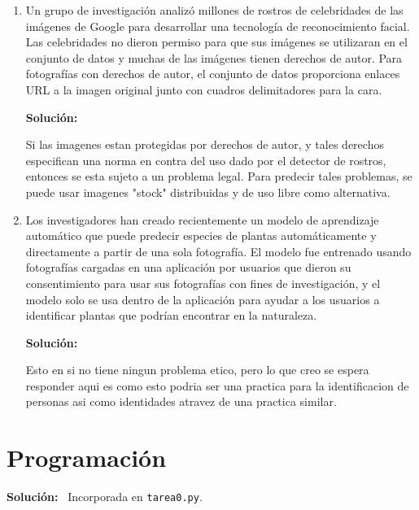 \documentclass[11pt,letterpaper]{article}
\newenvironment{solution}{%
  \noindent\begin{shaded}
  \textbf{Solución:}\ }{
  \end{shaded}%
}
\begin{document}
\begin{enumerate}
\item%
  Un grupo de investigación analizó millones de rostros de
  celebridades de las imágenes de Google para desarrollar una
  tecnología de reconocimiento facial.  Las celebridades no dieron
  permiso para que sus imágenes se utilizaran en el conjunto de datos
  y muchas de las imágenes tienen derechos de autor.  Para fotografías
  con derechos de autor, el conjunto de datos proporciona enlaces URL
  a la imagen original junto con cuadros delimitadores para la cara.
  \begin{solution}
  \end{solution}

  Si las imagenes estan protegidas por derechos de autor, y tales derechos especifican una norma en contra del uso dado por el detector de rostros, entonces se esta sujeto a un problema legal. Para predecir tales problemas, se puede usar imagenes "stock" distribuidas y de uso libre como alternativa.
  
\item%
  Los investigadores han creado recientemente un modelo de aprendizaje
  automático que puede predecir especies de plantas automáticamente y
  directamente a partir de una sola fotografía.  El modelo fue
  entrenado usando fotografías cargadas en una aplicación por usuarios
  que dieron su consentimiento para usar sus fotografías con fines de
  investigación, y el modelo solo se usa dentro de la aplicación para
  ayudar a los usuarios a identificar plantas que podrían encontrar en
  la naturaleza.
  \begin{solution}
  \end{solution}

    Esto en si no tiene ningun problema etico, pero lo que creo se espera responder aqui es como esto podria ser una practica para la identificacion de personas asi como identidades atravez de una practica similar.
  
\end{enumerate}



\section*{Programación}

\begin{solution}
  Incorporada en \texttt{tarea0.py}.
\end{solution}
\end{document}
